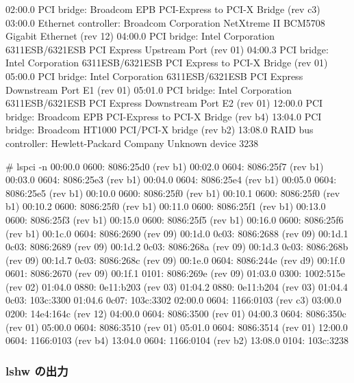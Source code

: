 \documentclass[mingoth,a4paper]{jsarticle}
\begin{document}
\begin{commandline}
02:00.0 PCI bridge: Broadcom EPB PCI-Express to PCI-X Bridge (rev c3)
03:00.0 Ethernet controller: Broadcom Corporation NetXtreme II BCM5708 Gigabit Ethernet (rev 12)
04:00.0 PCI bridge: Intel Corporation 6311ESB/6321ESB PCI Express Upstream Port (rev 01)
04:00.3 PCI bridge: Intel Corporation 6311ESB/6321ESB PCI Express to PCI-X Bridge (rev 01)
05:00.0 PCI bridge: Intel Corporation 6311ESB/6321ESB PCI Express Downstream Port E1 (rev 01)
05:01.0 PCI bridge: Intel Corporation 6311ESB/6321ESB PCI Express Downstream Port E2 (rev 01)
12:00.0 PCI bridge: Broadcom EPB PCI-Express to PCI-X Bridge (rev b4)
13:04.0 PCI bridge: Broadcom HT1000 PCI/PCI-X bridge (rev b2)
13:08.0 RAID bus controller: Hewlett-Packard Company Unknown device 3238

# lspci -n 
00:00.0 0600: 8086:25d0 (rev b1)
00:02.0 0604: 8086:25f7 (rev b1)
00:03.0 0604: 8086:25e3 (rev b1)
00:04.0 0604: 8086:25e4 (rev b1)
00:05.0 0604: 8086:25e5 (rev b1)
00:10.0 0600: 8086:25f0 (rev b1)
00:10.1 0600: 8086:25f0 (rev b1)
00:10.2 0600: 8086:25f0 (rev b1)
00:11.0 0600: 8086:25f1 (rev b1)
00:13.0 0600: 8086:25f3 (rev b1)
00:15.0 0600: 8086:25f5 (rev b1)
00:16.0 0600: 8086:25f6 (rev b1)
00:1c.0 0604: 8086:2690 (rev 09)
00:1d.0 0c03: 8086:2688 (rev 09)
00:1d.1 0c03: 8086:2689 (rev 09)
00:1d.2 0c03: 8086:268a (rev 09)
00:1d.3 0c03: 8086:268b (rev 09)
00:1d.7 0c03: 8086:268c (rev 09)
00:1e.0 0604: 8086:244e (rev d9)
00:1f.0 0601: 8086:2670 (rev 09)
00:1f.1 0101: 8086:269e (rev 09)
01:03.0 0300: 1002:515e (rev 02)
01:04.0 0880: 0e11:b203 (rev 03)
01:04.2 0880: 0e11:b204 (rev 03)
01:04.4 0c03: 103c:3300
01:04.6 0c07: 103c:3302
02:00.0 0604: 1166:0103 (rev c3)
03:00.0 0200: 14e4:164c (rev 12)
04:00.0 0604: 8086:3500 (rev 01)
04:00.3 0604: 8086:350c (rev 01)
05:00.0 0604: 8086:3510 (rev 01)
05:01.0 0604: 8086:3514 (rev 01)
12:00.0 0604: 1166:0103 (rev b4)
13:04.0 0604: 1166:0104 (rev b2)
13:08.0 0104: 103c:3238
\end{commandline}

\subsubsection{lshw の出力}
\end{document}
